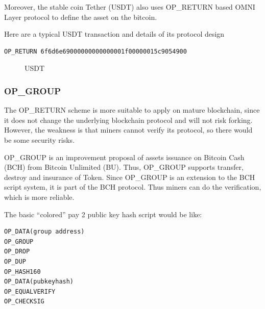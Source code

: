 \documentclass[a4paper,11pt]{article}
\begin{document}
Moreover, the stable coin Tether\cite{Tether} (USDT) also uses OP\_RETURN based OMNI Layer protocol to define the asset on the bitcoin.

Here are a typical USDT transaction and details of its protocol design


\lstset{basicstyle=\tiny,style=myListStyle}
\begin{lstlisting}
OP_RETURN 6f6d6e69000000000000001f00000015c9054900
\end{lstlisting}


\begin{figure}[hbt]
	\centerline{%
	}
\caption{USDT}
\end{figure}





\subsubsection*{OP\_GROUP}
The OP\_RETURN  scheme is more suitable to apply on mature blockchain, since it does not change the underlying blockchain protocol and will not risk forking. However, the weakness is that miners cannot verify its protocol, so there would be some security risks.

OP\_GROUP\cite{OP_GROUP}  is an improvement proposal of assets issuance on Bitcoin Cash (BCH)\cite{BCH} from Bitcoin Unlimited (BU). Thus, OP\_GROUP  supports transfer, destroy and insurance of Token. Since OP\_GROUP is an extension to the BCH script system,  it is part of the BCH protocol. Thus miners can do the verification, which is more reliable.

The basic “colored” pay 2 public key hash script would be like:

\lstset{basicstyle=\tiny,style=myListStyle}
\begin{lstlisting}[numbers=none]
OP_DATA(group address)
OP_GROUP
OP_DROP
OP_DUP
OP_HASH160
OP_DATA(pubkeyhash)
OP_EQUALVERIFY
OP_CHECKSIG
\end{lstlisting}
\end{document}
